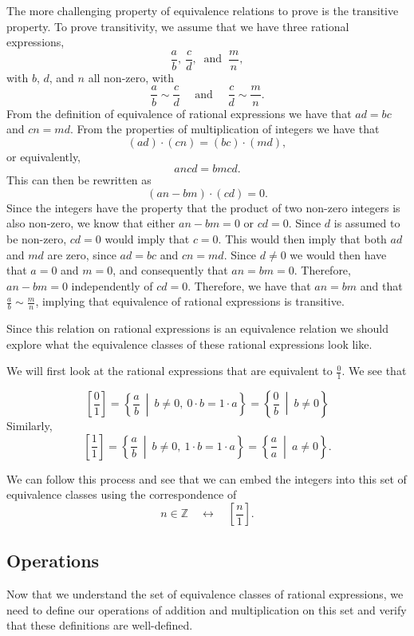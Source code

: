 \documentclass[
]{book}
\theoremstyle{definition}
\theoremstyle{definition}
\theoremstyle{definition}
\theoremstyle{definition}
\theoremstyle{remark}
\begin{document}
The more challenging property of equivalence relations to prove is the transitive property. To prove transitivity, we assume that we have three rational expressions, \[\frac{a}{b}, \: \frac{c}{d}, \: \mbox{ and } \: \frac{m}{n},\] with \(b\), \(d\), and \(n\) all non-zero, with \[\frac{a}{b}\sim \frac{c}{d} \quad \mbox{ and } \quad \frac{c}{d} \sim \frac{m}{n}.\] From the definition of equivalence of rational expressions we have that \(ad=bc\) and \(cn=md\). From the properties of multiplication of integers we have that \[(ad)\cdot (cn) = (bc) \cdot (md),\] or equivalently,
\[ancd = bmcd.\] This can then be rewritten as \[ (an-bm)\cdot (cd) =0.\] Since the integers have the property that the product of two non-zero integers is also non-zero, we know that either \(an-bm=0\) or \(cd=0\). Since \(d\) is assumed to be non-zero, \(cd=0\) would imply that \(c=0\). This would then imply that both \(ad\) and \(md\) are zero, since \(ad=bc\) and \(cn=md\). Since \(d\neq 0\) we would then have that \(a=0\) and \(m=0\), and consequently that \(an=bm=0\). Therefore, \(an-bm=0\) independently of \(cd=0\). Therefore, we have that \(an=bm\) and that \(\frac{a}{b}\sim \frac{m}{n}\), implying that equivalence of rational expressions is transitive.

Since this relation on rational expressions is an equivalence relation we should explore what the equivalence classes of these rational expressions look like.

We will first look at the rational expressions that are equivalent to \(\frac{0}{1}\). We see that

\[\left[\frac{0}{1}\right] = \left\{ \frac{a}{b} \: \middle \vert \: b\neq 0, \: 0\cdot b=1\cdot a\right\} = \left\{\frac{0}{b} \: \middle \vert \: b \neq 0 \right\}\]
Similarly,
\[\left[ \frac{1}{1}\right] = \left\{ \frac{a}{b} \: \middle \vert \: b\neq 0, \: 1\cdot b = 1 \cdot a\right\} = \left\{ \frac{a}{a} \: \middle \vert \: a \neq 0\right\}.\]

We can follow this process and see that we can embed the integers into this set of equivalence classes using the correspondence of
\[ n\in \mathbb{Z} \quad \leftrightarrow \quad \left[\frac{n}{1} \right] .\]

\hypertarget{operations}{%
\subsection{Operations}\label{operations}}

Now that we understand the set of equivalence classes of rational expressions, we need to define our operations of addition and multiplication on this set and verify that these definitions are well-defined.
\end{document}
